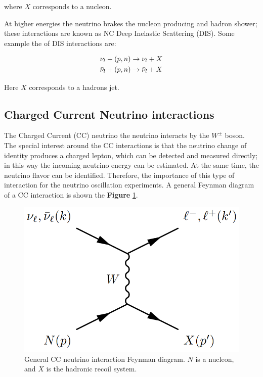 where $X$ corresponds to a nucleon. 

At higher energies the neutrino brakes the nucleon producing and hadron shower; these interactions are known as NC Deep Inelastic Scattering (DIS). Some example the of DIS interactions are: 

\begin{equation}
    \begin{split}
        \nu_l + (p,n) \rightarrow \nu_l + X \\
        \Bar{\nu}_l + (p,n) \rightarrow \Bar{\nu}_l + X \\
    \end{split}
\end{equation}

Here $X$ corresponds to a hadrons jet. 

\subsection{Charged Current Neutrino interactions}
\label{Cap:Int:NuInteractions:CC}

The Charged Current (CC) neutrino the neutrino interacts by the $W^\pm$ boson. The special interest around the CC interactions is that the neutrino change of identity produces a charged lepton, which can be detected and measured directly; in this way the incoming neutrino energy can be estimated. At the same time, the neutrino flavor can be identified. Therefore, the importance of this type of interaction for the neutrino oscillation experiments. A general Feynman diagram of a CC interaction is shown the \textbf{Figure} \ref{fig:Int:NuInteractions:CCFeynman}. 

\begin{figure}[!htb]
    \centering
    \includegraphics[scale=0.3]{Figures/Chapter1/CCFeynmanDiag.png}
    \caption{General CC neutrino interaction Feynman diagram. $N$ is a nucleon, and $X$ is the hadronic recoil system.}
    \label{fig:Int:NuInteractions:CCFeynman}
\end{figure}

